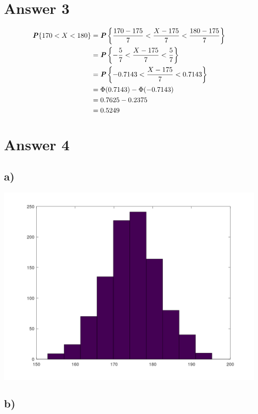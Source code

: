 \documentclass[12pt]{article}
\newcommand{\boldP}{\textbf{\textit{P}}}
\begin{document}
\newpage

\section*{Answer 3}

\begin{align*}
  \boldP\{170 < X < 180\}
    &= \boldP \left\{ \frac{170 - 175}{7}
                    < \frac{X - 175}{7} < \frac{180 - 175}{7} \right\} \\
    &= \boldP \left\{ -\frac{5}{7} < \frac{X - 175}{7} < \frac{5}{7} \right\} \\
    &= \boldP \left\{ -0.7143 < \frac{X - 175}{7} < 0.7143 \right\} \\
    &= \Phi(0.7143) - \Phi(-0.7143) \\
    &= 0.7625 - 0.2375 \\
    &= 0.5249
\end{align*}

\section*{Answer 4}

\subsection*{a)}

\includegraphics[width=\textwidth]{the2_hist.png}

\subsection*{b)}
\end{document}
